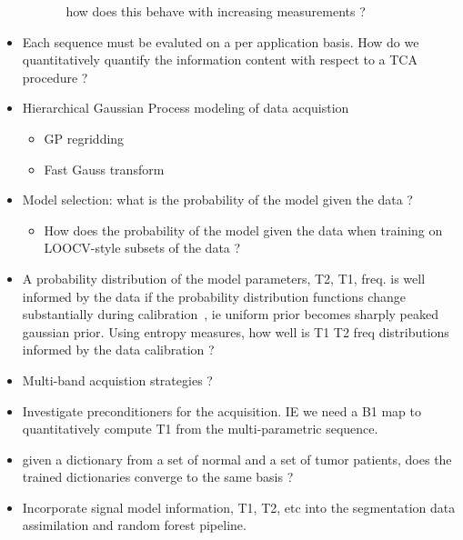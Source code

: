 \documentclass[10pt]{amsart}
\begin{document}
\begin{itemize}
\begin{itemize}
\begin{itemize}
\[                \]
               how does this behave with increasing measurements ? 
      \end{itemize}
  \end{itemize}
     \item Each sequence must be evaluted on a per application basis. How do
           we quantitatively quantify the information content with respect
           to a TCA procedure ? 
     \item Hierarchical Gaussian Process modeling of data  acquistion 
     \begin{itemize}
        \item GP regridding 
        \item Fast Gauss transform
     \end{itemize}
     \item Model selection: what is the probability of the model given the data ? 
     \begin{itemize}
        \item How does the probability of the model given the data when training on LOOCV-style subsets of the data ? 
     \end{itemize}
     \item A probability distribution of the model parameters, T2, T1, freq.
is well informed by the data if the probability distribution functions
change substantially during calibration~\cite{bauman2011statistical}, ie
uniform prior becomes sharply peaked gaussian prior. Using entropy measures,
how well is T1 T2 freq distributions informed by the data calibration ? 
     \item Multi-band acquistion strategies ? 
     \item Investigate preconditioners for the acquisition. IE we need a B1
           map to quantitatively compute T1 from the multi-parametric sequence.
     \item given a dictionary from a set of normal and a set of tumor
           patients, does the trained dictionaries converge to the same basis ? 
     \item Incorporate signal model information, T1, T2, etc into the segmentation data
           assimilation and random forest pipeline.
  \end{itemize}


\nocite{*}



\appendix
\end{document}
